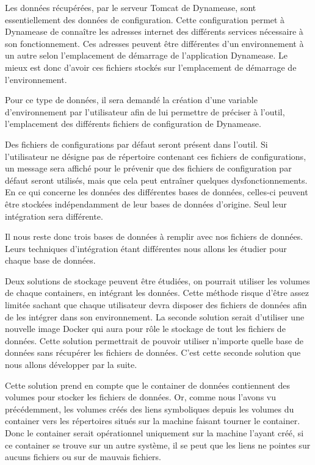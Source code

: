 Les données récupérées, par le serveur Tomcat de Dynamease, sont essentiellement des données de configuration. Cette configuration permet à Dynamease de connaître les adresses internet des différents services nécessaire à son fonctionnement. Ces adresses peuvent être différentes d'un environnement à un autre selon l'emplacement de démarrage de l'application Dynamease. Le mieux est donc d'avoir ces fichiers stockés sur l'emplacement de démarrage de l'environnement.

Pour ce type de données, il sera demandé la création d'une variable d'environnement par l'utilisateur afin de lui permettre de préciser à l'outil, l'emplacement des différents fichiers de configuration de Dynamease. 

Des fichiers de configurations par défaut seront présent dans l'outil. Si l'utilisateur ne désigne pas de répertoire contenant ces fichiers de configurations, un message sera affiché pour le prévenir que des fichiers de configuration par défaut seront utilisés, mais que cela peut entraîner quelques dysfonctionnements.\\

En ce qui concerne les données des différentes bases de données, celles-ci peuvent être stockées indépendamment de leur bases de données d'origine. Seul leur intégration sera différente.

Il nous reste donc trois bases de données à remplir avec nos fichiers de données. Leurs techniques d'intégration étant différentes nous allons les étudier pour chaque base de données. 

Deux solutions de stockage peuvent être étudiées, on pourrait utiliser les volumes de chaque containers, en intégrant les données. Cette méthode risque d'être assez limitée sachant que chaque utilisateur devra disposer des fichiers de données afin de les intégrer dans son environnement. La seconde solution serait d'utiliser une nouvelle image Docker qui aura pour rôle le stockage de tout les fichiers de données. Cette solution permettrait de pouvoir utiliser n'importe quelle base de données sans récupérer les fichiers de données. C'est cette seconde solution que nous allons développer par la suite.

Cette solution prend en compte que le container de données contiennent des volumes pour stocker les fichiers de données. Or, comme nous l'avons vu précédemment, les volumes créés des liens symboliques depuis les volumes du container vers les répertoires situés sur la machine faisant tourner le container. Donc le container serait opérationnel uniquement sur la machine l'ayant créé, si ce container se trouve sur un autre système, il se peut que les liens ne pointes sur aucuns fichiers ou sur de mauvais fichiers. 

